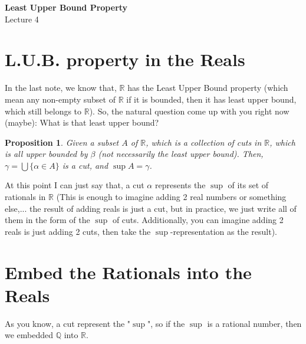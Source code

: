 \documentclass[12pt]{article}
\newcommand{\RR}{\mathbb{R}}   %
\newcommand{\QQ}{\mathbb{Q}}   %
\theoremstyle{definition}
\theoremstyle{plain}
\newtheorem{proposition}[definition]{Proposition}
\begin{document}

\begin{center}
    {\Large \textbf{Least Upper Bound Property}}\\[0.5em]
    {\large Lecture 4}
\end{center}

\tableofcontents

\newpage
\section{L.U.B. property in the Reals}
\begin{note}
In the last note, we know that, $\RR$ has the Least Upper Bound property (which mean any non-empty subset of $\RR$ if it is bounded, then it has least upper bound, which still belongs to $\RR$). So, the natural question come up with you right now (maybe): What is that least upper bound?
\end{note}

\begin{proposition}
Given a subset $A$ of $\RR$, which is a collection of cuts in $\RR$, which is all upper bounded by $\beta$ (not necessarily the least upper bound). Then, $\gamma = \bigcup\{\alpha \in A\}$ is a cut, and $\sup A = \gamma$. 
\end{proposition}


\begin{note}
At this point I can just say that, a cut $\alpha$ represents the $\sup$ of its set of rationals in $\RR$ (This is enough to imagine adding 2 real numbers or something else,... the result of adding reals is just a cut, but in practice, we just write all of them in the form of the $\sup$ of cuts. Additionally, you can imagine adding 2 reals is just adding 2 cuts, then take the $\sup$-representation as the result).
\end{note}

\section{Embed the Rationals into the Reals}
\begin{note}
As you know, a cut represent the "$\sup$", so if the $\sup$ is a rational number, then we embedded $\QQ$ into $\RR$.
\end{note}
\end{document}
